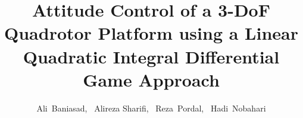 \documentclass[peerreview]{IEEEtran}
\begin{document}
%
\title{Attitude Control of a 3-DoF Quadrotor Platform using a Linear Quadratic Integral Differential Game Approach}
%
%
%

\author{Ali~Baniasad,~ Alireza Sharifi,~
        Reza~Pordal,~ Hadi~Nobahari
}

% 
%
\end{document}
